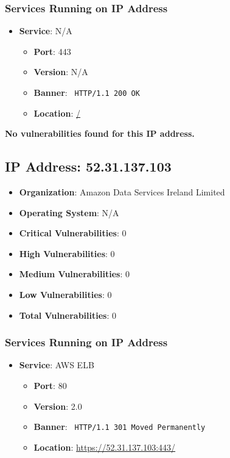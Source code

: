 \documentclass{article}
\begin{document}
\subsubsection*{Services Running on IP Address}

\begin{itemize}
    
        \item \textbf{Service}: N/A
        \begin{itemize}
            \item \textbf{Port}: 443
            \item \textbf{Version}:  N/A 
            \item \textbf{Banner}: \texttt{ HTTP/1.1 200 OK
 }
            \item \textbf{Location}: \href{ / }{ / }
        \end{itemize}
    
\end{itemize}


\textbf{No vulnerabilities found for this IP address.}


\clearpage



\subsection*{IP Address: 52.31.137.103}

\begin{itemize}
    \item \textbf{Organization}: Amazon Data Services Ireland Limited
    \item \textbf{Operating System}:  N/A 
    \item \textbf{Critical Vulnerabilities}: 0
    \item \textbf{High Vulnerabilities}: 0
    \item \textbf{Medium Vulnerabilities}: 0
    \item \textbf{Low Vulnerabilities}: 0
    \item \textbf{Total Vulnerabilities}: 0
\end{itemize}

\subsubsection*{Services Running on IP Address}

\begin{itemize}
    
        \item \textbf{Service}: AWS ELB
        \begin{itemize}
            \item \textbf{Port}: 80
            \item \textbf{Version}:  2.0 
            \item \textbf{Banner}: \texttt{ HTTP/1.1 301 Moved Permanently
 }
            \item \textbf{Location}: \href{ https://52.31.137.103:443/ }{ https://52.31.137.103:443/ }
        \end{itemize}
    
\end{itemize}
\end{document}
